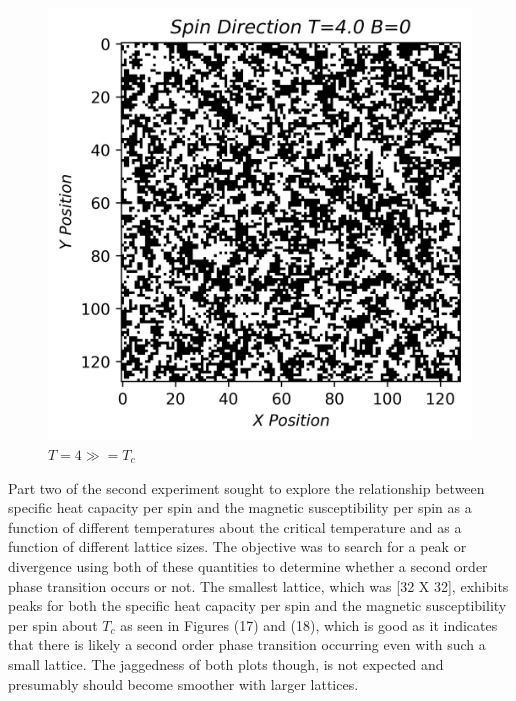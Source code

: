 \documentclass[twocolumn]{article}
\begin{document}
\begin{figure}[H]
\caption{$T=4\gg =T_c$ }
\centering
\includegraphics[scale=.6]{SpinsT=4B=0}
\end{figure}
Part two of the second experiment sought to explore the relationship between specific heat capacity per spin and the magnetic susceptibility per spin as a function of different temperatures about the critical temperature and as a function of different lattice sizes. The objective was to search for a peak or divergence using both of these quantities to determine whether a second order phase transition occurs or not. The smallest lattice, which was [32 X 32], exhibits peaks for both the specific heat capacity per spin and the magnetic susceptibility per spin about $T_c$ as seen in Figures (17) and (18), which is good as it indicates that there is likely a second order phase transition occurring even with such a small lattice. The jaggedness of both plots though, is not expected and presumably should become smoother with larger lattices.\\
\end{document}
